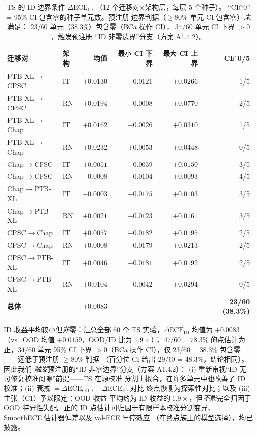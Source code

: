\begin{table}[t]
\centering
\caption{TS 的 ID 边界条件 $\Delta\text{ECE}_{\text{ID}}$
（12 个迁移对$\times$架构层，每层 5 个种子）。
``CI$\cap$0'' = 95\% CI 包含零的种子单元数。预注册
边界判据（$\geq$80\% 单元 CI 包含零）\emph{未}满足：
23/60 单元（38.3\%）包含零（BCa 操作 CI），
34/60 单元 CI 下界 $>0$，触发预注册
``ID 非零边界''分支（方案 A1.4.2）。}
\label{tab:boundary}
\footnotesize
\begin{tabular}{llrrrr}
\toprule
迁移对 & 架构 & 均值 & 最小 CI 下界 & 最大 CI 上界 & CI$\cap$0/5 \\
\midrule
PTB-XL$\rightarrow$CPSC   & IT & $+0.0130$ & $-0.0121$ & $+0.0266$ & 1/5 \\
PTB-XL$\rightarrow$CPSC   & RN & $+0.0194$ & $-0.0008$ & $+0.0770$ & 2/5 \\
PTB-XL$\rightarrow$Chap   & IT & $+0.0162$ & $-0.0026$ & $+0.0310$ & 1/5 \\
PTB-XL$\rightarrow$Chap   & RN & $+0.0232$ & $+0.0053$ & $+0.0448$ & 0/5 \\
Chap$\rightarrow$CPSC     & IT & $+0.0051$ & $-0.0039$ & $+0.0150$ & 3/5 \\
Chap$\rightarrow$CPSC     & RN & $-0.0008$ & $-0.0104$ & $+0.0093$ & 4/5 \\
Chap$\rightarrow$PTB-XL   & IT & $-0.0003$ & $-0.0175$ & $+0.0103$ & 3/5 \\
Chap$\rightarrow$PTB-XL   & RN & $+0.0021$ & $-0.0123$ & $+0.0161$ & 3/5 \\
CPSC$\rightarrow$Chap     & IT & $+0.0057$ & $-0.0182$ & $+0.0195$ & 2/5 \\
CPSC$\rightarrow$Chap     & RN & $+0.0008$ & $-0.0179$ & $+0.0213$ & 2/5 \\
CPSC$\rightarrow$PTB-XL   & IT & $+0.0046$ & $-0.0181$ & $+0.0192$ & 2/5 \\
CPSC$\rightarrow$PTB-XL   & RN & $+0.0104$ & $-0.0042$ & $+0.0294$ & 0/5 \\
\midrule
\textbf{总体} & & $\mathbf{+0.0083}$ & & & \textbf{23/60 (38.3\%)} \\
\bottomrule
\end{tabular}
\end{table}

ID 收益平均较小但\emph{非}零：汇总全部
60 个 TS 实验，$\Delta\text{ECE}_{\text{ID}}$ 均值为 $+0.0083$
（vs.\ OOD 均值 $+0.0159$，OOD/ID 比为 $1.9\times$）；
$47/60 = 78.3\%$ 的点估计为正，$34/60$ 单元 95\%
CI 下界 $>0$（BCa 操作 CI），仅 $23/60 = 38.3\%$
包含零——远低于预注册 $\geq$80\% 判据
（百分位 CI 给出 29/60 = 48.3\%，结论相同）。因此我们
\emph{触发}预注册的``ID 非零边界''分支（方案 A1.4.2）：
(i) 重新审视``ID 无可修复校准间隙''前提——TS 在源校准
分割上拟合，在许多单元中也改善了 ID 校准；(ii) 衰减
$=\Delta\text{ECE}_{\text{OOD}}-\Delta\text{ECE}_{\text{ID}}$ 对比
终点恢复为探索性对比；以及 (iii) 主张（C1）予以限定：OOD 收益
平均约为 ID 收益的 $1.9\times$，但\emph{不能}完全归因于
OOD 特异性失配。正的 ID 点估计可归因于有限样本校准分割变异、
SmoothECE 估计器偏差以及 val-ECE 早停效应
（在终点族上的模型选择），均已披露。

